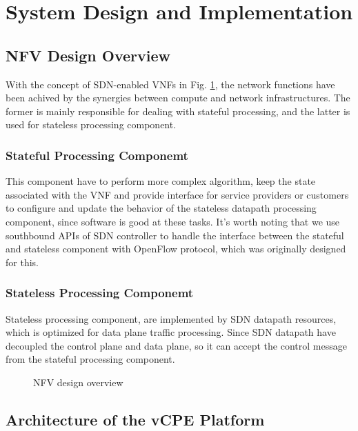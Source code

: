 \section{System Design and Implementation}
\subsection{NFV Design Overview}
With the concept of SDN-enabled VNFs in Fig. \ref{fig:vnf_overview}, the network functions have been achived by the synergies between compute and network infrastructures. The former is mainly responsible for dealing with stateful processing, and the latter is used for stateless processing component.

\subsubsection{Stateful Processing Componemt}
This component have to perform more complex algorithm, keep the state associated with the VNF and provide interface for service providers or customers to configure and update the behavior of the stateless datapath processing component, since software is good at these tasks. It's worth noting that we use southbound APIs of SDN controller to handle the interface between the stateful and stateless component with OpenFlow protocol, which was originally designed for this.

\subsubsection{Stateless Processing Componemt}
Stateless processing component, are implemented by SDN datapath resources, which is optimized for data plane traffic processing. Since SDN datapath have decoupled the control plane and data plane, so it can accept the control message from the stateful processing component.

\begin{figure}[!t]
  \centering
  \def\svgwidth{\linewidth}
  
  \caption{NFV design overview}
  \label{fig:vnf_overview}
\end{figure}

\subsection{Architecture of the vCPE Platform}

